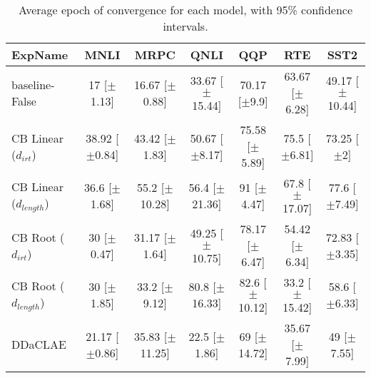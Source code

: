 \begin{table*}[ht]
\centering
\begingroup\small
\begin{tabular}{lcccccc}
  \hline
ExpName & MNLI & MRPC & QNLI & QQP & RTE & SST2 \\ 
  \hline
baseline-False & 17 [$\pm$1.13] & 16.67 [$\pm$0.88] & 33.67 [$\pm$15.44] & 70.17 [$\pm$9.9] & 63.67 [$\pm$6.28] & 49.17 [$\pm$10.44] \\ 
  CB Linear ($d_{irt}$) & 38.92 [$\pm$0.84] & 43.42 [$\pm$1.83] & 50.67 [$\pm$8.17] & 75.58 [$\pm$5.89] & 75.5 [$\pm$6.81] & 73.25 [$\pm$2] \\ 
  CB Linear ($d_{length}$) & 36.6 [$\pm$1.68] & 55.2 [$\pm$10.28] & 56.4 [$\pm$21.36] & 91 [$\pm$4.47] & 67.8 [$\pm$17.07] & 77.6 [$\pm$7.49] \\ 
  CB Root ($d_{irt}$) & 30 [$\pm$0.47] & 31.17 [$\pm$1.64] & 49.25 [$\pm$10.75] & 78.17 [$\pm$6.47] & 54.42 [$\pm$6.34] & 72.83 [$\pm$3.35] \\ 
  CB Root ($d_{length}$) & 30 [$\pm$1.85] & 33.2 [$\pm$9.12] & 80.8 [$\pm$16.33] & 82.6 [$\pm$10.12] & 33.2 [$\pm$15.42] & 58.6 [$\pm$6.33] \\ 
  DDaCLAE & 21.17 [$\pm$0.86] & 35.83 [$\pm$11.25] & 22.5 [$\pm$1.86] & 69 [$\pm$14.72] & 35.67 [$\pm$7.99] & 49 [$\pm$7.55] \\ 
   \hline
\end{tabular}
\endgroup
\caption{Average epoch of convergence for each model, with 95\% confidence intervals.} 
\label{tab:epoch_lstm-False}
\end{table*}
